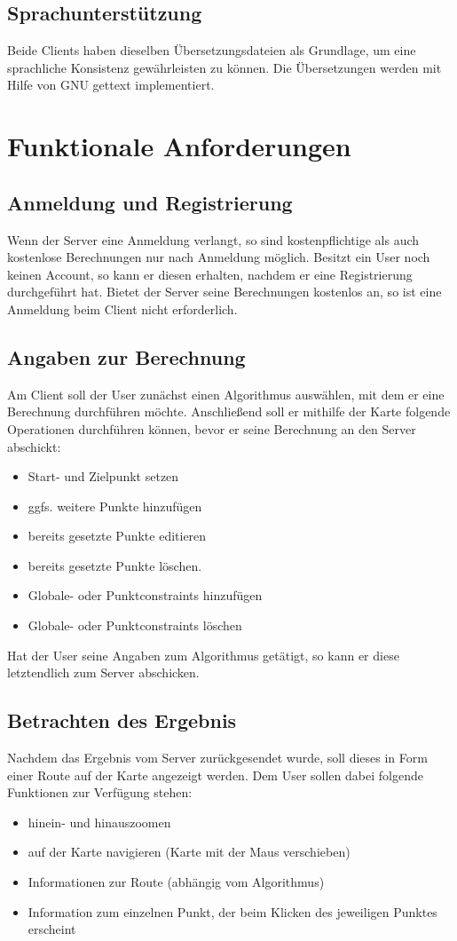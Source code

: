 \documentclass[a4paper,10pt,titlepage]{article}
\begin{document}
\subsection{Sprachunterstützung}
Beide Clients haben dieselben Übersetzungsdateien als Grundlage, um eine sprachliche Konsistenz gewährleisten zu können.
Die Übersetzungen werden mit Hilfe von GNU gettext implementiert.

\clearpage
\section{Funktionale Anforderungen}

\subsection{Anmeldung und Registrierung}
Wenn der Server eine Anmeldung verlangt, so sind kostenpflichtige als auch kostenlose Berechnungen nur nach Anmeldung möglich. 
Besitzt ein User noch keinen Account, so kann er diesen erhalten, nachdem er eine Registrierung durchgeführt hat.
Bietet der Server seine Berechnungen kostenlos an, so ist eine Anmeldung beim Client nicht erforderlich.

\subsection{Angaben zur Berechnung}
Am Client soll der User zunächst einen Algorithmus auswählen, mit dem er eine Berechnung durchführen möchte.
Anschließend soll er mithilfe der Karte folgende Operationen durchführen können, bevor er seine Berechnung an den Server abschickt:
\begin{itemize}
 \item Start- und Zielpunkt setzen
 \item ggfs. weitere Punkte hinzufügen
 \item bereits gesetzte Punkte editieren
 \item bereits gesetzte Punkte löschen.
 \item Globale- oder Punktconstraints hinzufügen
 \item Globale- oder Punktconstraints löschen
\end{itemize}
Hat der User seine Angaben zum Algorithmus getätigt, so kann er diese letztendlich zum Server abschicken.

\subsection{Betrachten des Ergebnis}
Nachdem das Ergebnis vom Server zurückgesendet wurde, soll dieses in Form einer Route auf der Karte angezeigt werden.
Dem User sollen dabei folgende Funktionen zur Verfügung stehen:
\begin{itemize}
 \item hinein- und hinauszoomen
 \item auf der Karte navigieren (Karte mit der Maus verschieben)
 \item Informationen zur Route (abhängig vom Algorithmus)
 \item Information zum einzelnen Punkt, der beim Klicken des jeweiligen Punktes erscheint
\end{itemize}
\end{document}
